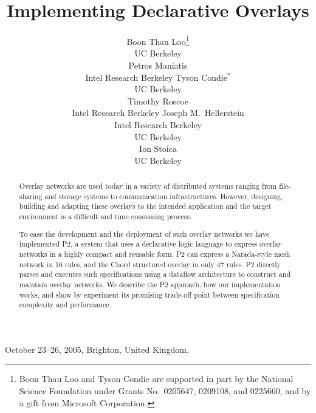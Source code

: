 \documentclass{sig-alt-full}
\def\Sys{P2\xspace}
\def\PChordLines{47\xspace}
\def\PNaradaLines{16\xspace}
\begin{document}
 {October 23--26, 2005, Brighton, United Kingdom.}

\title{Implementing Declarative Overlays}


\author{
\alignauthor
Boon Thau Loo\thanks{Boon Thau Loo and Tyson Condie are supported in
  part by the National Science Foundation under Grants No.\ 0205647,
  0209108, and 0225660, and by a gift from Microsoft Corporation.}\\
{\affaddr UC Berkeley}\\
\vspace{24pt}
Petros Maniatis\\
{\affaddr Intel Research Berkeley}
\alignauthor
Tyson Condie$^*$\\
{\affaddr UC Berkeley}\\
\vspace{24pt}
Timothy Roscoe\\
{\affaddr Intel Research Berkeley}
\alignauthor
Joseph M.\ Hellerstein\\
{\affaddr Intel Research Berkeley}\\
{\affaddr UC Berkeley}\\
\vspace{13.5pt}
Ion Stoica\\
{\affaddr UC Berkeley}
}
\date{}
\maketitle

\begin{abstract}
Overlay networks are used today in a variety of distributed systems
ranging from file-sharing and storage systems to communication
infrastructures.  However, designing, building and adapting these
overlays to the intended application and the target environment is a
difficult and time consuming process.

To ease the development and the deployment of such overlay networks
we have implemented \Sys, a system that uses a declarative logic
language to express overlay networks in a highly compact and
reusable form. \Sys can express a Narada-style mesh network in
\PNaradaLines rules, and the Chord structured overlay in only
\PChordLines rules.  \Sys directly parses and executes such
specifications using a dataflow architecture to construct and maintain
overlay networks.  We describe the \Sys approach, how our
implementation works, and show by experiment its promising trade-off point
between specification complexity and performance.

\end{abstract}
\end{document}
